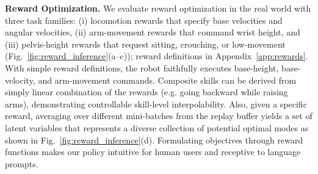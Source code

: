 \textbf{Reward Optimization.}
We evaluate reward optimization in the real world with three task families: (i) locomotion rewards that specify base velocities and angular velocities, (ii) arm-movement rewards that command wrist height, and (iii) pelvis-height rewards that request sitting, crouching, or low-movement (Fig.~\ref{fig:reward_inference}(a–c)); reward definitions in Appendix~\ref{app:rewards}.
With simple reward definitions, the robot faithfully executes base-height, base-velocity, and arm-movement commands. Composite skills can be derived from simply linear combination of the rewards (e.g. going backward while raising arms), demonstrating controllable skill-level interpolability. Also, given a specific reward, averaging over different mini-batches from the replay buffer yields a set of latent variables that represents a diverse collection of potential optimal modes as shown in Fig.~\ref{fig:reward_inference}(d). Formulating objectives through reward functions makes our policy intuitive for human users and receptive to language prompts.


